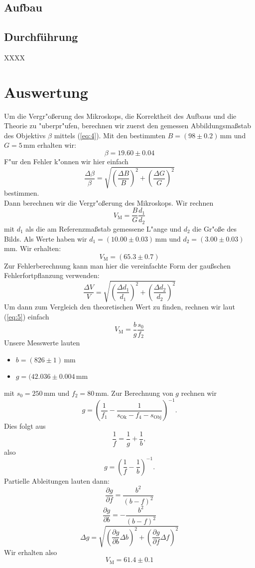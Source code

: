 \documentclass[11pt,a4paper]{article}
\newcommand{\halftime}[4]{\begin{figure}[h]
\begin{minipage}{.#1\textwidth}#3\end{minipage}\begin{minipage}{.#2\textwidth}
\centering
#4\end{minipage}
\end{figure}}
\begin{document}
\subsection{Aufbau}


\subsection{Durchführung}

XXXX

\section{Auswertung}

Um die Vergr"o\ss erung des Mikroskops, die Korrektheit des Aufbaus und die Theorie zu "uberpr"ufen, berechnen wir zuerst den gemessen Abbildungsma\ss stab des Objektivs $\beta$ mittels (\ref{eq:4}). Mit den bestimmten $B=(98\pm0.2)\,$mm und $G=5\,$mm erhalten wir:
\[\beta=19.60\pm0.04\]
F"ur den Fehler k"onnen wir hier einfach
\[
\frac{\Delta\beta}{\beta}=\sqrt{\left(\frac{\Delta B}{B}\right)^2+\left(\frac{\Delta G}{G}\right)^2}
\]
bestimmen.\\
Dann berechnen wir die Vergr"o\ss erung des Mikroskops. Wir rechnen
\[V_\textrm{M}=\frac{B}{G}\frac{d_1}{d_2}\]
mit $d_1$ als die am Referenzma\ss stab gemessene L"ange und $d_2$ die Gr"o\ss e des Bilds. Als Werte haben wir $d_1=(10.00\pm0.03)\,$mm und $d_2=(3.00\pm0.03)\,$mm. Wir erhalten:
\[V_\textrm{M}=(65.3\pm0.7)\]
Zur Fehlerberechnung kann man hier die vereinfachte Form der gau\ss schen Fehlerfortpflanzung verwenden:
\[
\frac{\Delta V}{V}=\sqrt{\left(\frac{\Delta d_1}{d_1}\right)^2+\left(\frac{\Delta d_2}{d_2}\right)^2}
\]
Um dann zum Vergleich den theoretischen Wert zu finden, rechnen wir laut (\ref{eq:5}) einfach
\[V_\mathrm{M}=\frac{b}{g}\frac{s_0}{f_2}\]
Unsere Messwerte lauten
\begin{itemize}
\item $b=(826\pm1)\,$mm
\item $g=(42.036\pm0.004\,$mm
\end{itemize}
mit $s_0=250\,$mm und $f_2=80\,$mm. Zur Berechnung von $g$ rechnen wir
\[
g=\left(\frac{1}{f_1}-\frac{1}{s_{\mathrm{Ok}}-f_4-s_{\mathrm{Obj}}}\right)^{-1}.
\]
Dies folgt aus
\[\frac{1}{f}=\frac{1}{g}+\frac{1}{b},\]
also
\[g=\left(\frac{1}{f}-\frac{1}{b}\right)^{-1}.\]
Partielle Ableitungen lauten dann:
\[
\frac{\partial g}{\partial f}=\frac{b^2}{(b-f)^2}
\]
\[
\frac{\partial g}{\partial b}=-\frac{b^2}{(b-f)^2}
\]
\[
\Delta g=\sqrt{\left(\frac{\partial g}{\partial b}\Delta b\right)^2+\left(\frac{\partial g}{\partial f}\Delta f\right)^2}
\]
Wir erhalten also
\[V_\mathrm{M}=61.4\pm0.1\]
\end{document}
